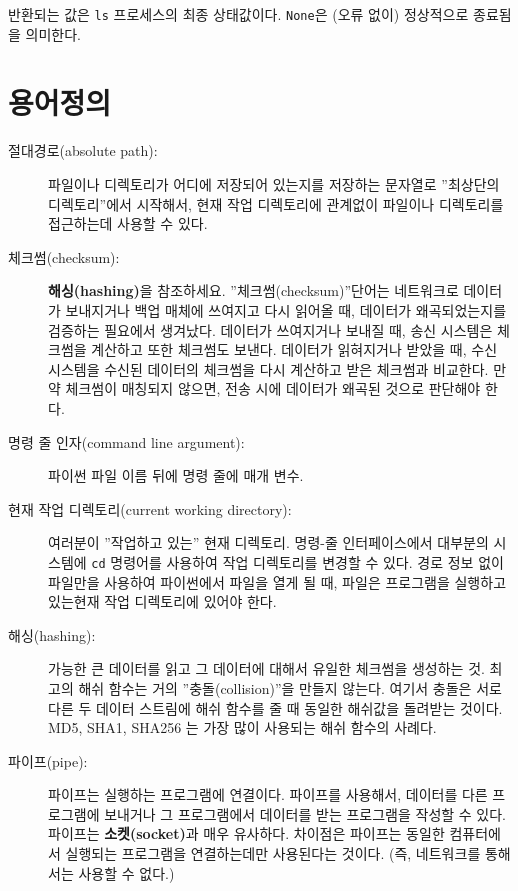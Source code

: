 반환되는 값은 {\tt ls} 프로세스의 최종 상태값이다. 
{\tt None}은 (오류 없이) 정상적으로 종료됨을 의미한다.

\section{용어정의}

\begin{description}

\item[절대경로(absolute path):]
파일이나 디렉토리가 어디에 저장되어 있는지를 저장하는 문자열로 ''최상단의 디렉토리''에서 시작해서,
현재 작업 디렉토리에 관계없이 파일이나 디렉토리를 접근하는데 사용할 수 있다.

\item[체크썸(checksum):] {\bf 해싱(hashing)}을 참조하세요.
''체크썸(checksum)''단어는 네트워크로 데이터가 보내지거나 백업 매체에 쓰여지고 다시 읽어올 때, 데이터가 왜곡되었는지를
검증하는 필요에서 생겨났다.
데이터가 쓰여지거나 보내질 때, 송신 시스템은 체크썸을 계산하고 또한 체크썸도 보낸다.
데이터가 읽혀지거나 받았을 때, 수신 시스템을 수신된 데이터의 체크썸을 다시 계산하고 받은 체크썸과 비교한다.
만약 체크썸이 매칭되지 않으면, 전송 시에 데이터가 왜곡된 것으로 판단해야 한다.

\item[명령 줄 인자(command line argument):]파이썬 파일 이름 뒤에 명령 줄에 매개 변수.

\item[현재 작업 디렉토리(current working directory):]
여러분이 ''작업하고 있는'' 현재 디렉토리. 
명령-줄 인터페이스에서 대부분의 시스템에 {\tt cd} 명령어를 사용하여 작업 디렉토리를 변경할 수 있다. 
경로 정보 없이 파일만을 사용하여 파이썬에서 파일을 열게 될 때,
파일은 프로그램을 실행하고 있는현재 작업 디렉토리에 있어야 한다. 


\item[해싱(hashing):] 
가능한 큰 데이터를 읽고 그 데이터에 대해서 유일한 체크썸을 생성하는 것.
최고의 해쉬 함수는 거의 ''충돌(collision)''을 만들지 않는다. 여기서 충돌은 
서로 다른 두 데이터 스트림에 해쉬 함수를 줄 때 동일한 해쉬값을 돌려받는 것이다.
MD5, SHA1, SHA256 는 가장 많이 사용되는 해쉬 함수의 사례다.

\item[파이프(pipe):]
파이프는 실행하는 프로그램에 연결이다. 
파이프를 사용해서, 데이터를 다른 프로그램에 보내거나 그 프로그램에서
데이터를 받는 프로그램을 작성할 수 있다.
파이프는 {\bf 소켓(socket)}과 매우 유사하다. 
차이점은 파이프는 동일한 컴퓨터에서 실행되는 프로그램을 연결하는데만 사용된다는 것이다. 
(즉, 네트워크를 통해서는 사용할 수 없다.)


\end{description}
